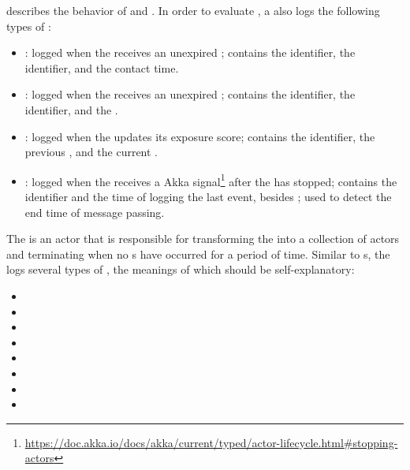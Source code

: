  describes the behavior of  and . In order to evaluate , a  also logs the following types of :
\begin{itemize}
  \item {}: logged when the  receives an unexpired ; contains the  identifier, the  identifier, and the contact time.
  \item {}: logged when the  receives an unexpired ; contains the  identifier, the  identifier, and the .
  \item {}: logged when the  updates its exposure score; contains the  identifier, the previous , and the current .
  \item {}: logged when the  receives a  Akka signal\footnote{\url{https://doc.akka.io/docs/akka/current/typed/actor-lifecycle.html\#stopping-actors}} after the  has stopped; contains the  identifier and the time of logging the last event, besides ; used to detect the end time of message passing.
\end{itemize}

The  is an actor that is responsible for transforming the  into a collection of  actors and terminating when no s have occurred for a period of time. Similar to s, the  logs several types of , the meanings of which should be self-explanatory:
\begin{multicols}{2}
\begin{itemize}
  \item {}
  \item {}
  \item {}
  \item {}
  \item {}
  \item {}
  \item {}
  \item {}
\end{itemize}  
\end{multicols}

